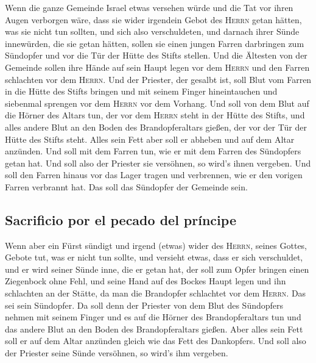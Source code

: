 Wenn die ganze Gemeinde Israel etwas versehen würde und
die Tat vor ihren Augen verborgen wäre, dass sie wider irgendein Gebot
des \textsc{Herrn} getan hätten, was sie nicht tun sollten, und sich
also verschuldeten,  und darnach ihrer Sünde innewürden,
die sie getan hätten, sollen sie einen jungen Farren darbringen zum
Sündopfer und vor die Tür der Hütte des Stifts stellen. 
Und die Ältesten von der Gemeinde sollen ihre Hände auf sein Haupt legen
vor dem \textsc{Herrn} und den Farren schlachten vor dem \textsc{Herrn}.
 Und der Priester, der gesalbt ist, soll Blut vom Farren
in die Hütte des Stifts bringen  und mit seinem Finger
hineintauchen und siebenmal sprengen vor dem \textsc{Herrn} vor dem
Vorhang.  Und soll von dem Blut auf die Hörner des Altars
tun, der vor dem \textsc{Herrn} steht in der Hütte des Stifts, und alles
andere Blut an den Boden des Brandopferaltars gießen, der vor der Tür
der Hütte des Stifts steht.  Alles sein Fett aber soll er
abheben und auf dem Altar anzünden.  Und soll mit dem
Farren tun, wie er mit dem Farren des Sündopfers getan hat. Und soll
also der Priester sie versöhnen, so wird's ihnen vergeben.
 Und soll den Farren hinaus vor das Lager tragen und
verbrennen, wie er den vorigen Farren verbrannt hat. Das soll das
Sündopfer der Gemeinde sein.

\hypertarget{sacrificio-por-el-pecado-del-pruxedncipe}{%
\subsection{Sacrificio por el pecado del
príncipe}\label{sacrificio-por-el-pecado-del-pruxedncipe}}

 Wenn aber ein Fürst sündigt und irgend (etwas) wider des
\textsc{Herrn}, seines Gottes, Gebote tut, was er nicht tun sollte, und
versieht etwas, dass er sich verschuldet,  und er wird
seiner Sünde inne, die er getan hat, der soll zum Opfer bringen einen
Ziegenbock ohne Fehl,  und seine Hand auf des Bockes
Haupt legen und ihn schlachten an der Stätte, da man die Brandopfer
schlachtet vor dem \textsc{Herrn}. Das sei sein Sündopfer.
 Da soll denn der Priester von dem Blut des Sündopfers
nehmen mit seinem Finger und es auf die Hörner des Brandopferaltars tun
und das andere Blut an den Boden des Brandopferaltars gießen.
 Aber alles sein Fett soll er auf dem Altar anzünden
gleich wie das Fett des Dankopfers. Und soll also der Priester seine
Sünde versöhnen, so wird's ihm vergeben.

